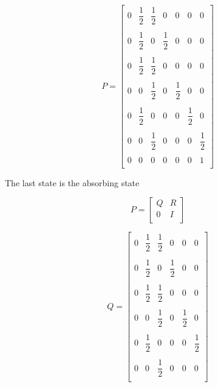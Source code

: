 \documentclass[unicode,11pt,a4paper,oneside,numbers=endperiod,openany]{scrartcl}
\begin{document}
\[
		P = \begin{bmatrix}
		        0 & \dfrac{1}{2} & \dfrac{1}{2} & 0 & 0 & 0 & 0\\
		        \\
                0 & \dfrac{1}{2} & 0 & \dfrac{1}{2} & 0 & 0 & 0\\
                \\
                0 & \dfrac{1}{2} & \dfrac{1}{2} & 0 & 0 & 0 & 0\\
                \\
                0 & 0 & \dfrac{1}{2} & 0 & \dfrac{1}{2} & 0 & 0\\
                \\
                0 & \dfrac{1}{2} & 0 & 0 & 0 & \dfrac{1}{2} & 0\\
                \\
                0 & 0 & \dfrac{1}{2} & 0 & 0 & 0 & \dfrac{1}{2}\\
                \\
                0 & 0 & 0 & 0 & 0 & 0 & 1\\
              \end{bmatrix}
    \]
    

        {The last state is the absorbing state} 

    
    \[ P = 
		\begin{bmatrix}
                Q & R\\
                0 & I\\
        \end{bmatrix}
   \]
   
   \[ Q = 
		\begin{bmatrix}
		        0 & \dfrac{1}{2} & \dfrac{1}{2} & 0 & 0 & 0\\
		        \\
                0 & \dfrac{1}{2} & 0 & \dfrac{1}{2} & 0 & 0\\
                \\
                0 & \dfrac{1}{2} & \dfrac{1}{2} & 0 & 0 & 0\\
                \\
                0 & 0 & \dfrac{1}{2} & 0 & \dfrac{1}{2} & 0\\
                \\
                0 & \dfrac{1}{2} & 0 & 0 & 0 & \dfrac{1}{2}\\
                \\
                0 & 0 & \dfrac{1}{2} & 0 & 0 & 0\\
        \end{bmatrix}
   \]
   
\end{document}
